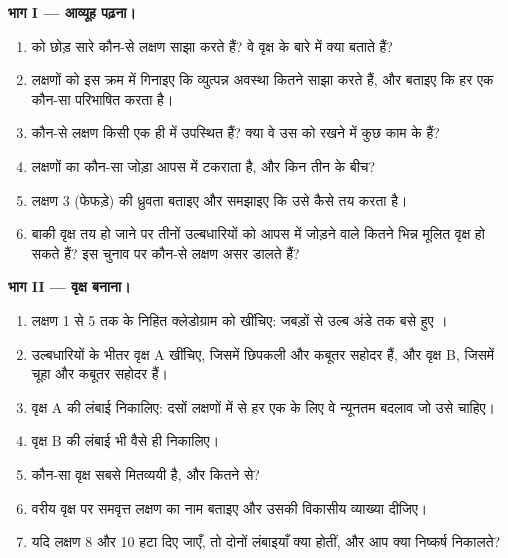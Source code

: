 \begin{problem}
\medskip
\noindent\textbf{भाग I --- आव्यूह पढ़ना।}
\begin{enumerate}
  \item {} को छोड़ सारे  कौन-से लक्षण साझा करते हैं? वे
        वृक्ष के बारे में क्या बताते हैं?
  \item लक्षणों को इस क्रम में गिनाइए कि व्युत्पन्न अवस्था कितने 
        साझा करते हैं, और बताइए कि हर एक कौन-सा  परिभाषित करता है।
  \item कौन-से लक्षण किसी एक ही  में उपस्थित हैं? क्या वे उस 
        को रखने में कुछ काम के हैं?
  \item लक्षणों का कौन-सा जोड़ा आपस में टकराता है, और किन तीन  के
        बीच?
  \item लक्षण 3 (फेफड़े) की ध्रुवता बताइए और समझाइए कि  उसे
        कैसे तय करता है।
  \item बाकी वृक्ष तय हो जाने पर तीनों उल्बधारियों को आपस में जोड़ने
        वाले कितने भिन्न मूलित वृक्ष हो सकते हैं? इस चुनाव पर कौन-से
        लक्षण असर डालते हैं?
\end{enumerate}

\medskip
\noindent\textbf{भाग II --- वृक्ष बनाना।}
\begin{enumerate}[resume]
  \item लक्षण 1 से 5 तक के निहित क्लेडोग्राम को खींचिए: जबड़ों से उल्ब
        अंडे तक बसे हुए ।
  \item उल्बधारियों के भीतर वृक्ष A खींचिए, जिसमें छिपकली और कबूतर
        सहोदर  हैं, और वृक्ष B, जिसमें चूहा और कबूतर सहोदर हैं।
  \item वृक्ष A की लंबाई निकालिए: दसों लक्षणों में से हर एक के लिए वे
        न्यूनतम बदलाव जो उसे चाहिए।
  \item वृक्ष B की लंबाई भी वैसे ही निकालिए।
  \item कौन-सा वृक्ष सबसे मितव्ययी है, और कितने से?
  \item वरीय वृक्ष पर समवृत्त लक्षण का नाम बताइए और उसकी विकासीय
        व्याख्या दीजिए।
  \item यदि लक्षण 8 और 10 हटा दिए जाएँ, तो दोनों लंबाइयाँ क्या होतीं,
        और आप क्या निष्कर्ष निकालते?
\end{enumerate}


\end{problem}
